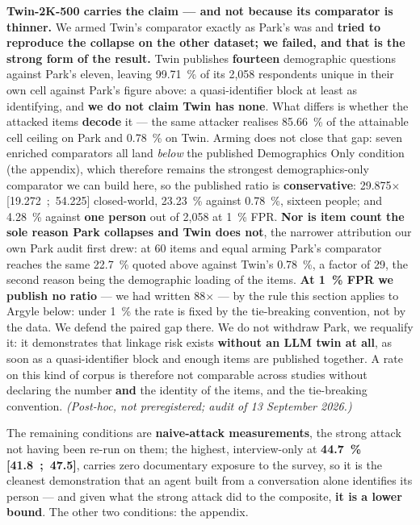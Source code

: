 \documentclass[sigconf,anonymous,review]{acmart}
\begin{document}
\textbf{Twin-2K-500 carries the claim --- and not because its comparator is thinner.} We armed Twin's comparator exactly as Park's was and \textbf{tried to reproduce the collapse on the other dataset; we failed, and that is the strong form of the result.} Twin publishes \textbf{fourteen} demographic questions against Park's eleven, leaving 99.71~\% of its 2,058 respondents unique in their own cell against Park's figure above: a quasi-identifier block at least as identifying, and \textbf{we do not claim Twin has none}. What differs is whether the attacked items \textbf{decode} it --- the same attacker realises 85.66~\% of the attainable cell ceiling on Park and 0.78~\% on Twin. Arming does not close that gap: seven enriched comparators all land \textit{below} the published Demographics Only condition (the appendix), which therefore remains the strongest demographics-only comparator we can build here, so the published ratio is \textbf{conservative}: 29.875$\times$ [19.272~;~54.225] closed-world, 23.23~\% against 0.78~\%, sixteen people; and 4.28~\% against \textbf{one person} out of 2,058 at 1~\% FPR. \textbf{Nor is item count the sole reason Park collapses and Twin does not}, the narrower attribution our own Park audit first drew: at 60 items and equal arming Park's comparator reaches the same 22.7~\% quoted above against Twin's 0.78~\%, a factor of 29, the second reason being the demographic loading of the items. \textbf{At 1~\% FPR we publish no ratio} --- we had written 88$\times$ --- by the rule this section applies to Argyle below: under 1~\% the rate is fixed by the tie-breaking convention, not by the data. We defend the paired gap there. We do not withdraw Park, we requalify it: it demonstrates that linkage risk exists \textbf{without an LLM twin at all}, as soon as a quasi-identifier block and enough items are published together. A rate on this kind of corpus is therefore not comparable across studies without declaring the number \textbf{and} the identity of the items, and the tie-breaking convention. \textit{(Post-hoc, not preregistered; audit of 13 September 2026.)}

The remaining conditions are \textbf{naive-attack measurements}, the strong attack not having been re-run on them; the highest, interview-only at \textbf{44.7~\% [41.8~;~47.5]}, carries zero documentary exposure to the survey, so it is the cleanest demonstration that an agent built from a conversation alone identifies its person --- and given what the strong attack did to the composite, \textbf{it is a lower bound}. The other two conditions: the appendix.
\end{document}
